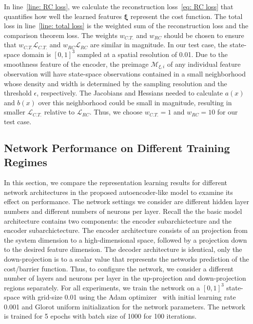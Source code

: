 \documentclass[letterpaper]{article} %
\newcommand{\todo}[1]{\textcolor{blue}{[TODO: #1]}}
\begin{document}
In line~\ref{line: RC loss}, we calculate the reconstruction loss~\eqref{eq: RC loss} that quantifies how well the learned features $\boldsymbol\xi$ represent the cost function. The total loss in line~\ref{line: total loss} is the weighted sum of the reconstruction loss and the comparison theorem loss. The weights $w_{C.T.}$ and $w_{RC}$ should be chosen to ensure that $w_{C.T.}\mathcal{L}_{C.T.}$ and $w_{RC}\mathcal{L}_{RC}$ are similar in magnitude. In our test case, the state-space domain is $[0, 1]^3$
sampled at a spatial resolution of 0.01. Due to the smoothness feature of the encoder, the preimage $\mathcal{M}_{\xi, i}$ of any individual feature observation will have state-space observations contained in a small neighborhood whose density and width is determined by the sampling resolution and the threshold $\epsilon$, respectively. 
The Jacobians and Hessians needed to calculate $a(x)$ and $b(x)$ over this neighborhood could be small in magnitude, resulting in smaller $\mathcal{L}_{C.T.}$ relative to $\mathcal{L}_{RC}$. Thus, we choose $w_{C.T.}=1$ and $w_{RC}=10$ for our test case.  



\subsection{Network Performance on Different Training Regimes}
In this section, we compare the representation learning results for different network architectures in the proposed autoencoder-like model to examine its effect on performance. The network settings we consider are different hidden layer numbers and different numbers of neurons per layer. Recall the the basic model architecture contains two components: the encoder subarchictecture and the encoder subarchictecture. The encoder architecture consists of an projection from the system dimension to a high-dimensional space, followed by a projection down to the desired feature dimension. The decoder architecture is identical, only the down-projection is to a scalar value that represents the networks prediction of the cost/barrier function. Thus, to configure the network, we consider a different number of layers and neurons per layer in the up-projection and down-projection regions separately. For all experiments, we train the network on a $[0, 1]^3$ state-space with grid-size 0.01 using the Adam optimizer~\cite{kingma2017adam} with initial learning rate 0.001 and Glorot uniform initialization for the network parameters. The network is trained for 5 epochs with batch size of 1000 for 100 iterations. 
\end{document}

